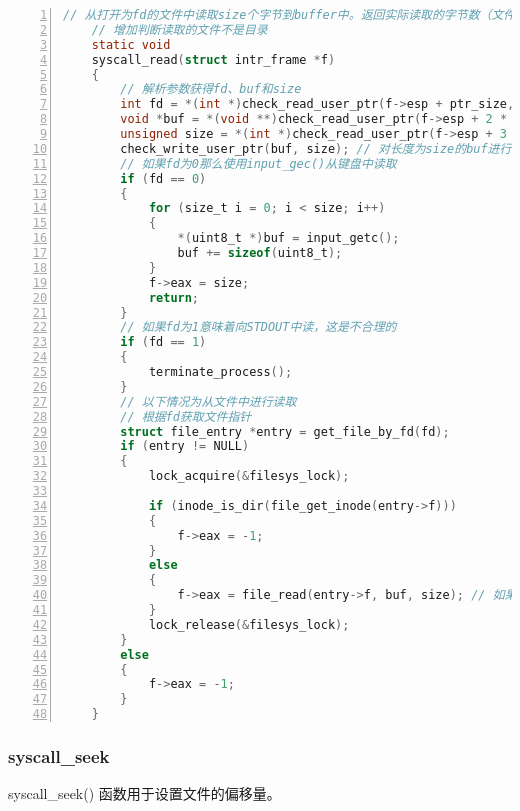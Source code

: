 \documentclass{article}
\begin{document}
	\begin{lstlisting}[xleftmargin = 4em,xrightmargin = 4em, aboveskip = 1em, numbers = left, language = C,title=src/userprog/syscall.c - syscall\_read()]
    // 从打开为fd的文件中读取size个字节到buffer中。返回实际读取的字节数（文件末尾为0），如果无法读取文件（由于文件末尾以外的条件），则返回-1。 fd 0使用input_getc()从键盘读取。
    // 增加判断读取的文件不是目录
    static void
    syscall_read(struct intr_frame *f)
    {
        // 解析参数获得fd、buf和size
        int fd = *(int *)check_read_user_ptr(f->esp + ptr_size, sizeof(int));
        void *buf = *(void **)check_read_user_ptr(f->esp + 2 * ptr_size, ptr_size);
        unsigned size = *(int *)check_read_user_ptr(f->esp + 3 * ptr_size, sizeof(unsigned));
        check_write_user_ptr(buf, size); // 对长度为size的buf进行指针校验
        // 如果fd为0那么使用input_gec()从键盘中读取
        if (fd == 0)
        {
            for (size_t i = 0; i < size; i++)
            {
                *(uint8_t *)buf = input_getc();
                buf += sizeof(uint8_t);
            }
            f->eax = size;
            return;
        }
        // 如果fd为1意味着向STDOUT中读，这是不合理的
        if (fd == 1)
        {
            terminate_process();
        }
        // 以下情况为从文件中进行读取
        // 根据fd获取文件指针
        struct file_entry *entry = get_file_by_fd(fd);
        if (entry != NULL)
        {
            lock_acquire(&filesys_lock);
            
            if (inode_is_dir(file_get_inode(entry->f)))
            {
                f->eax = -1;
            }
            else
            {
                f->eax = file_read(entry->f, buf, size); // 如果entry不为NULL那么将size个字节读入buf同时返回size给eax
            }
            lock_release(&filesys_lock);
        }
        else
        {
            f->eax = -1;
        }
    }
	\end{lstlisting}
	
	\subsubsection{syscall\_seek}
	
	syscall\_seek() 函数用于设置文件的偏移量。
	
\end{document}

